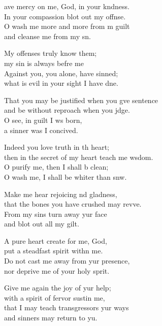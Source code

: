 \settowidth{\versewidth}{That you may be justified when you give sentence *}
\begin{psalmverse}%
  \begin{patverse}
    ave mercy on me, God, in your k\pointup{\i}ndness.\Med\\
In your compassion blot out my offnse.\\
O wash me more and more from m guilt\Med\\
and cleanse me from my s\pointup{\i}n.

My offenses truly  know them;\Med\\
my sin is always befre me\\
Against you, you alone, have  sinned;\Med\\
what is evil in your sight I have dne.

That you may be justified when you g\pointup{\i}ve sentence\Med\\
and be without reproach when you jdge.\\
O see, in guilt I ws born,\Med\\
a sinner was I concived.

Indeed you love truth in th heart;\Med\\
then in the secret of my heart teach me w\pointup{\i}sdom.\\
O purify me, then I shall b clean;\Med\\
O wash me, I shall be whiter than snw.

Make me hear rejoicing nd gladness,\Med\\
that the bones you have crushed may rev\pointup{\i}ve.\\
From my sins turn away yur face\Med\\
and blot out all my gilt.

A pure heart create for me,  God,\Med\\
put a steadfast spirit with\pointup{\i}n me.\\
Do not cast me away from yur presence,\Med\\
nor deprive me of your holy sp\pointup{\i}rit.

Give me again the joy of yur help;\Med\\
with a spirit of fervor sustin me,\\
that I may teach transgressors yur ways\Med\\
and sinners may return to yu.


\end{patverse}
\end{psalmverse}
